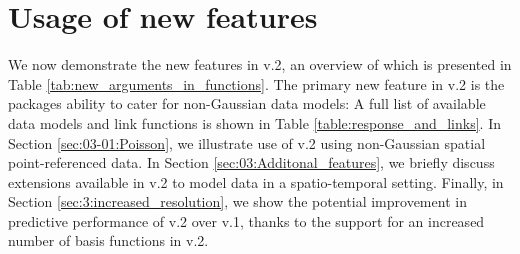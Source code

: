 \documentclass[article]{jss}
\begin{document}
\section{Usage of new features}\label{SEC:IllustrativeExample}

We now demonstrate the new features in  v.2, an overview of which is presented in Table \ref{tab:new_arguments_in_functions}. 
 The primary new feature in  v.2 is the packages ability to cater for non-Gaussian data models: A full list of available data models and link functions is shown in Table \ref{table:response_and_links}. 
 In Section \ref{sec:03-01:Poisson}, we illustrate use of  v.2 using non-Gaussian spatial point-referenced data. %
 In Section \ref{sec:03:Additonal_features}, we briefly discuss extensions available in  v.2 to model data in a spatio-temporal setting. 
 Finally, in Section \ref{sec:3:increased_resolution}, we show the potential improvement in predictive performance of  v.2 over  v.1, thanks to the support for an increased number of basis functions in  v.2.
% 
\end{document}
